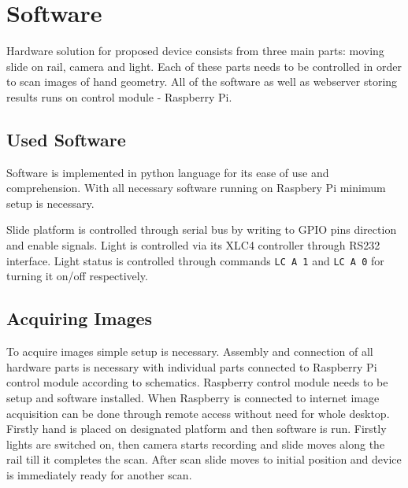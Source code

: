 \section{Software}
Hardware solution for proposed device consists from three main parts: moving slide on rail, camera and light.
Each of these parts needs to be controlled in order to scan images of hand geometry.
All of the software as well as webserver storing results runs on control module - Raspberry Pi.

\label{sec:sw}
\subsection{Used Software}
Software is implemented in python language for its ease of use and comprehension. With all necessary software running
on Raspbery Pi minimum setup is necessary.

Slide platform is controlled through serial bus by writing to GPIO pins direction and enable signals.
Light is controlled via its XLC4 controller through RS232 interface.
Light status is controlled through commands \texttt{LC A 1} and \texttt{LC A 0} for turning it on/off respectively.

\subsection{Acquiring Images}
To acquire images simple setup is necessary. Assembly and connection of all hardware parts is necessary with individual
parts connected to Raspberry Pi control module according to schematics. Raspberry control module needs to be setup and
software installed.
When Raspberry is connected to internet image acquisition can be done through remote access without need for whole desktop.
Firstly hand is placed on designated platform and then software is run. Firstly lights are switched on, then camera starts
recording and slide moves along the rail till it completes the scan. After scan slide moves to initial position and device
is immediately ready for another scan.


